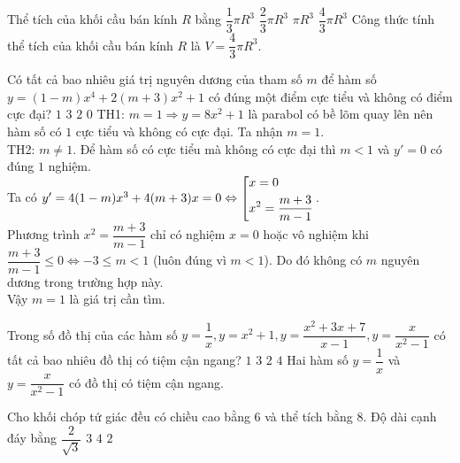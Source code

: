 \begin{ex}%
	Thể tích của khối cầu bán kính $R$ bằng 
	\choice
	{$\dfrac{1}{3}\pi R^3$}
	{$\dfrac{2}{3}\pi R^3$}
	{$\pi R^3$}
	{\True $\dfrac{4}{3}\pi R^3$}
	\loigiai
	{Công thức tính thể tích của khối cầu bán kính $R$ là $V=\dfrac{4}{3}\pi R^3$.}
\end{ex}

\begin{ex}%
	Có tất cả bao nhiêu giá trị nguyên dương của tham số $m$ để hàm số $y = \left(1 - m \right)x^4 + 2\left(m + 3\right)x^2 + 1$ có đúng một điểm cực tiểu và không có điểm cực đại?
	\choice
	{\True $1$}
	{$3$}
	{$2$}
	{$0$}
	\loigiai
	{TH1: $m=1\Rightarrow y=8x^2+1$ là parabol có bề lõm quay lên nên hàm số có $1$ cực tiểu và không có cực đại. Ta nhận $m=1$.\\TH2: $m\neq 1$. Để hàm số có cực tiểu mà không có cực đại thì $m<1$ và $y'=0$ có đúng $1$ nghiệm.\\Ta có $y'=4(1-m)x^3+4(m+3)x=0\Leftrightarrow\left[\begin{aligned}&x=0\\&x^2=\dfrac{m+3}{m-1}\end{aligned}\right.$.\\Phương trình $x^2=\dfrac{m+3}{m-1}$ chỉ có nghiệm $x=0$ hoặc vô nghiệm khi $\dfrac{m+3}{m-1}\leq 0\Leftrightarrow -3\leq m<1$ (luôn đúng vì $m<1$). Do đó không có $m$ nguyên dương trong trường hợp này.\\Vậy $m=1$ là giá trị cần tìm.}
\end{ex}

\begin{ex}%
	Trong số đồ thị của các hàm số $y = \dfrac {1} {x}, y = x^2 + 1, y = \dfrac {x^2 + 3x + 7} {x - 1}, y = \dfrac {x}{x^2 - 1}$ có tất cả bao nhiêu đồ thị có tiệm cận ngang?
	\choice
	{$1$}
	{$3$}
	{\True $2$}
	{$4$}
	\loigiai
	{Hai hàm số $y = \dfrac {1} {x}$ và $y = \dfrac {x}{x^2 - 1}$ có đồ thị có tiệm cận ngang.}
\end{ex}

\begin{ex}%
	Cho khối chóp tứ giác đều có chiều cao bằng $6$ và thể tích bằng $8$. Độ dài cạnh đáy bằng
	\choice
	{$\dfrac{2}{\sqrt{3}}$}
	{$3$}
	{$4$}
	{\True $2$}
\end{ex}

